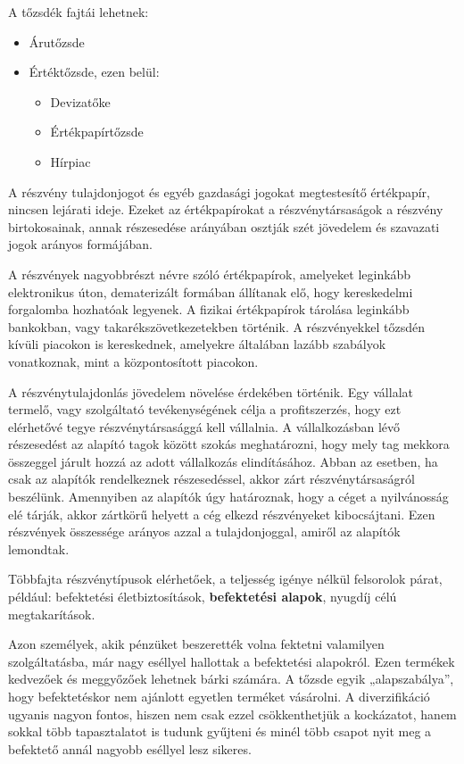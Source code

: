 A tőzsdék fajtái lehetnek: 

\begin{itemize}
\item Árutőzsde
\item Értéktőzsde, ezen belül: 
	\begin{itemize}
	     \item Devizatőke
	     \item Értékpapírtőzsde 
	     \item Hírpiac
	\end{itemize}
\end{itemize}


A részvény tulajdonjogot és egyéb gazdasági jogokat megtestesítő értékpapír, nincsen lejárati ideje. Ezeket az értékpapírokat a részvénytársaságok a részvény birtokosainak, annak részesedése arányában osztják szét jövedelem és szavazati jogok arányos formájában.

	A részvények nagyobbrészt névre szóló értékpapírok, amelyeket leginkább elektronikus úton, dematerizált formában állítanak elő, hogy kereskedelmi forgalomba hozhatóak legyenek. A fizikai értékpapírok tárolása leginkább bankokban, vagy takarékszövetkezetekben történik. A részvényekkel tőzsdén kívüli piacokon is kereskednek, amelyekre általában lazább szabályok vonatkoznak, mint a központosított piacokon. 

	A részvénytulajdonlás jövedelem növelése érdekében történik. Egy vállalat termelő, vagy szolgáltató tevékenységének célja a profitszerzés, hogy ezt elérhetővé tegye részvénytársasággá kell vállalnia. A vállalkozásban lévő részesedést az alapító tagok között szokás meghatározni, hogy mely tag mekkora összeggel járult hozzá az adott vállalkozás elindításához. Abban az esetben, ha csak az alapítók rendelkeznek részesedéssel, akkor zárt részvénytársaságról beszélünk. Amennyiben az alapítók úgy határoznak, hogy a céget a nyilvánosság elé tárják, akkor zártkörű helyett a cég elkezd részvényeket kibocsájtani. Ezen részvények összessége arányos azzal a tulajdonjoggal, amiről az alapítók lemondtak.

	Többfajta részvénytípusok elérhetőek, a teljesség igénye nélkül felsorolok párat, például: befektetési életbiztosítások, \textbf{befektetési alapok}, nyugdíj célú megtakarítások.  \cite{wikiShare}


Azon személyek, akik pénzüket beszerették volna fektetni valamilyen szolgáltatásba, már nagy eséllyel hallottak a befektetési alapokról. Ezen termékek kedvezőek és meggyőzőek lehetnek bárki számára. A tőzsde egyik „alapszabálya”, hogy befektetéskor nem ajánlott egyetlen terméket vásárolni. A diverzifikáció ugyanis nagyon fontos, hiszen nem csak ezzel csökkenthetjük a kockázatot, hanem sokkal több tapasztalatot is tudunk gyűjteni és minél több csapot nyit meg a befektető annál nagyobb eséllyel lesz sikeres. \cite{OTPInvest}

